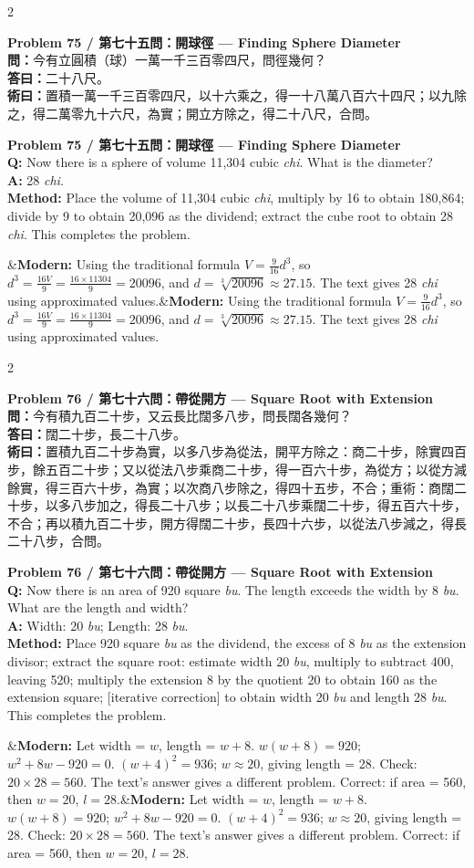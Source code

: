 \documentclass[11pt,a4paper]{article}
\newcommand{\bilingualproblem}[4]{%
  \begin{paracol}{2}
  \begin{leftcolumn}
  \noindent\textbf{\color{problemcolor}#1}\\[0.2cm]
  #2
  \end{leftcolumn}
  \switchcolumn
  \noindent\textbf{\color{problemcolor}#1}\\[0.2cm]
  #3
  \end{paracol}
  \ifx&#4&\else\vspace{0.3cm}\noindent#4\fi
  \vspace{0.5cm}
}
\newcommand{\wen}[1]{\textcolor{problemcolor}{\textbf{問：}}#1}
\newcommand{\da}[1]{\textcolor{answercolor}{\textbf{答曰：}}#1}
\newcommand{\shu}[1]{\textcolor{methodcolor}{\textbf{術曰：}}#1}
\newcommand{\wenen}[1]{\textcolor{problemcolor}{\textbf{Q:}} #1}
\newcommand{\daen}[1]{\textcolor{answercolor}{\textbf{A:}} #1}
\newcommand{\shuen}[1]{\textcolor{methodcolor}{\textbf{Method:}} #1}
\begin{document}
\bilingualproblem{Problem 75 / 第七十五問：開球徑 --- Finding Sphere Diameter}{
\wen{今有立圓積（球）一萬一千三百零四尺，問徑幾何？}\\[0.2cm]
\da{二十八尺。}\\[0.2cm]
\shu{置積一萬一千三百零四尺，以十六乘之，得一十八萬八百六十四尺；以九除之，得二萬零九十六尺，為實；開立方除之，得二十八尺，合問。}
}{
\wenen{Now there is a sphere of volume 11,304 cubic \textit{chi}. What is the diameter?}\\[0.2cm]
\daen{28 \textit{chi}.}\\[0.2cm]
\shuen{Place the volume of 11,304 cubic \textit{chi}, multiply by 16 to obtain 180,864; divide by 9 to obtain 20,096 as the dividend; extract the cube root to obtain 28 \textit{chi}. This completes the problem.}
}{\textbf{Modern:} Using the traditional formula $V = \frac{9}{16}d^3$, so $d^3 = \frac{16V}{9} = \frac{16 \times 11304}{9} = 20096$, and $d = \sqrt[3]{20096} \approx 27.15$. The text gives 28 \textit{chi} using approximated values.}

\bilingualproblem{Problem 76 / 第七十六問：帶從開方 --- Square Root with Extension}{
\wen{今有積九百二十步，又云長比闊多八步，問長闊各幾何？}\\[0.2cm]
\da{闊二十步，長二十八步。}\\[0.2cm]
\shu{置積九百二十步為實，以多八步為從法，開平方除之：商二十步，除實四百步，餘五百二十步；又以從法八步乘商二十步，得一百六十步，為從方；以從方減餘實，得三百六十步，為實；以次商八步除之，得四十五步，不合；重術：商闊二十步，以多八步加之，得長二十八步；以長二十八步乘闊二十步，得五百六十步，不合；再以積九百二十步，開方得闊二十步，長四十六步，以從法八步減之，得長二十八步，合問。}
}{
\wenen{Now there is an area of 920 square \textit{bu}. The length exceeds the width by 8 \textit{bu}. What are the length and width?}\\[0.2cm]
\daen{Width: 20 \textit{bu}; Length: 28 \textit{bu}.}\\[0.2cm]
\shuen{Place 920 square \textit{bu} as the dividend, the excess of 8 \textit{bu} as the extension divisor; extract the square root: estimate width 20 \textit{bu}, multiply to subtract 400, leaving 520; multiply the extension 8 by the quotient 20 to obtain 160 as the extension square; [iterative correction] to obtain width 20 \textit{bu} and length 28 \textit{bu}. This completes the problem.}
}{\textbf{Modern:} Let width = $w$, length = $w + 8$. $w(w+8) = 920$; $w^2 + 8w - 920 = 0$. $(w+4)^2 = 936$; $w \approx 20$, giving length = 28. Check: $20 \times 28 = 560$. The text's answer gives a different problem. Correct: if area = 560, then $w = 20$, $l = 28$.}
\end{document}
